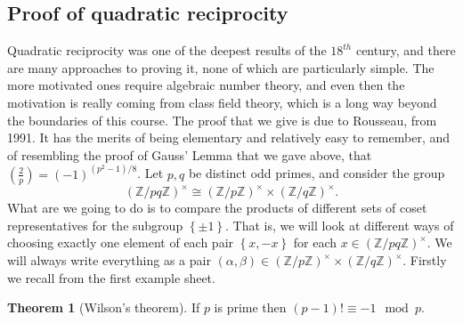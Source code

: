 \documentclass{article}
\newcommand{\Z}{\mathbb{Z}}
\newcommand{\rb}[1]{\left( #1 \right)}
\newcommand{\cb}[1]{\left\{ #1 \right\}}
\newcommand{\unit}[1]{\rb{\Z / #1\Z}^\times}
\newcommand{\legendre}[2]{\rb{\tfrac{#1}{#2}}}
\theoremstyle{definition}\newtheorem{definition}{Definition}
\theoremstyle{definition}\newtheorem{remark}[definition]{Remark}
\theoremstyle{definition}\newtheorem*{example}{Example}
\theoremstyle{definition}\newtheorem*{note}{Note}
\newtheorem{theorem}[definition]{Theorem}
\begin{document}

\subsection{Proof of quadratic reciprocity}

Quadratic reciprocity was one of the deepest results of the $ 18^{th} $ century, and there are many approaches to proving it, none of which are particularly simple. The more motivated ones require algebraic number theory, and even then the motivation is really coming from class field theory, which is a long way beyond the boundaries of this course. The proof that we give is due to Rousseau, from 1991. It has the merits of being elementary and relatively easy to remember, and of resembling the proof of Gauss' Lemma that we gave above, that $ \legendre{2}{p} = \rb{-1}^{\rb{p^2 - 1} / 8} $. Let $ p, q $ be distinct odd primes, and consider the group
$$ \unit{pq} \cong \unit{p} \times \unit{q}. $$
What are we going to do is to compare the products of different sets of coset representatives for the subgroup $ \cb{\pm 1} $. That is, we will look at different ways of choosing exactly one element of each pair $ \cb{x, -x} $ for each $ x \in \unit{pq} $. We will always write everything as a pair $ \rb{\alpha, \beta} \in \unit{p} \times \unit{q} $. Firstly we recall from the first example sheet.

\begin{theorem}[Wilson's theorem]
If $ p $ is prime then $ \rb{p - 1}! \equiv -1 \mod p $.
\end{theorem}
\end{document}
